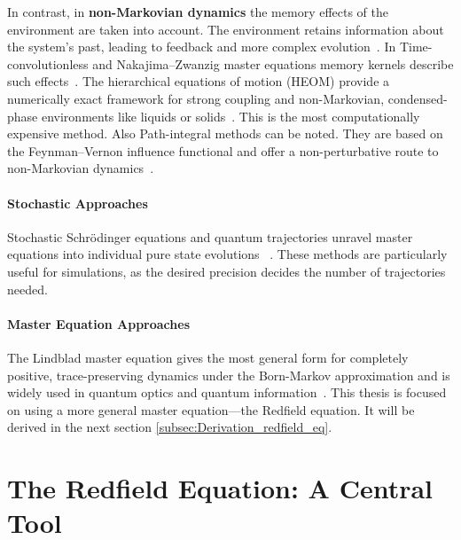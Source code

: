 \noindent
In contrast, in \textbf{non-Markovian dynamics} the memory effects of the environment are taken into account. The environment retains information about the system's past, leading to feedback and more complex evolution~\cite{breuerpetruccione2009theoryopenquantum, rivasetal2014quantumnonmarkovianitycharacterization}.
\noindent
In Time-convolutionless and Nakajima–Zwanzig master equations memory kernels describe such effects~\cite{breuerpetruccione2009theoryopenquantum, rivasetal2014quantumnonmarkovianitycharacterization}. The hierarchical equations of motion (HEOM) provide a numerically exact framework for strong coupling and non-Markovian, condensed-phase environments like liquids or solids~\cite{tanimura2020numericallyexactapproach}. This is the most computationally expensive method. Also Path-integral methods can be noted. They are based on the Feynman–Vernon influence functional and offer a non-perturbative route to non-Markovian dynamics~\cite{weiss2012quantumdissipativesystems}.


\paragraph{Stochastic Approaches}

\noindent
Stochastic Schrödinger equations and quantum trajectories unravel master equations into individual pure state evolutions ~\cite{vogtetal2013stochasticblochredfieldtheory, breuerpetruccione2009theoryopenquantum, carmichael1993opensystemsapproach}. These methods are particularly useful for simulations, as the desired precision decides the number of trajectories needed.

\paragraph{Master Equation Approaches}

\noindent
The Lindblad master equation gives the most general form for completely positive, trace-preserving dynamics under the Born-Markov approximation and is widely used in quantum optics and quantum information~\cite{breuerpetruccione2009theoryopenquantum, lindblad1976generatorsquantumdynamical}.
This thesis is focused on using a more general master equation—the Redfield equation. It will be derived in the next section \ref{subsec:Derivation_redfield_eq}.


\section{The Redfield Equation: A Central Tool}
\label{sec:Redfield_eq}

